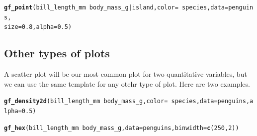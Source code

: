 \documentclass[twoside]{book}\usepackage[]{graphicx}\usepackage[]{xcolor}
\makeatletter
\newcommand{\hlnum}[1]{\textcolor[rgb]{0.686,0.059,0.569}{#1}}%
\newcommand{\hlopt}[1]{\textcolor[rgb]{0,0,0}{#1}}%
\newcommand{\hlstd}[1]{\textcolor[rgb]{0.345,0.345,0.345}{#1}}%
\newcommand{\hlkwc}[1]{\textcolor[rgb]{0.333,0.667,0.333}{#1}}%
\newcommand{\hlkwd}[1]{\textcolor[rgb]{0.737,0.353,0.396}{\textbf{#1}}}%
\newenvironment{kframe}{%
 \def\at@end@of@kframe{}%
 \ifinner\ifhmode%
  \def\at@end@of@kframe{\end{minipage}}%
  \begin{minipage}{\columnwidth}%
 \fi\fi%
 \def\FrameCommand##1{\hskip\@totalleftmargin \hskip-\fboxsep
 \colorbox{shadecolor}{##1}\hskip-\fboxsep
     \hskip-\linewidth \hskip-\@totalleftmargin \hskip\columnwidth}%
 \MakeFramed {\advance\hsize-\width
   \@totalleftmargin\z@ \linewidth\hsize
   \@setminipage}}%
 {\par\unskip\endMakeFramed%
 \at@end@of@kframe}
\newenvironment{knitrout}{}{} %
\newcounter{example}[section]
\makeatother
\begin{document}
\begin{knitrout}
\color{fgcolor}\begin{kframe}
\begin{alltt}
\hlkwd{gf_point}\hlstd{(bill_length_mm} \hlopt{~} \hlstd{body_mass_g} \hlopt{|} \hlstd{island,} \hlkwc{color} \hlstd{=} \hlopt{~} \hlstd{species,} \hlkwc{data} \hlstd{= penguins,}
         \hlkwc{size} \hlstd{=} \hlnum{0.8}\hlstd{,} \hlkwc{alpha} \hlstd{=} \hlnum{0.5}\hlstd{)}
\end{alltt}


{\ttfamily\noindent\bfseries\color{errorcolor}{\#\# Error in gf\_ingredients(formula = gformula, data = data, gg\_object = object, : object 'penguins' not found}}\end{kframe}
\end{knitrout}

\subsection{Other types of plots}

A scatter plot will be our most common plot for two quantitative variables, but we can use the same
template for any otehr type of plot.  Here are two examples.

\begin{knitrout}
\color{fgcolor}\begin{kframe}
\begin{alltt}
\hlkwd{gf_density2d}\hlstd{(bill_length_mm} \hlopt{~} \hlstd{body_mass_g,} \hlkwc{color} \hlstd{=} \hlopt{~} \hlstd{species,} \hlkwc{data} \hlstd{= penguins,} \hlkwc{alpha} \hlstd{=} \hlnum{0.5}\hlstd{)}
\end{alltt}


{\ttfamily\noindent\bfseries\color{errorcolor}{\#\# Error in gf\_ingredients(formula = gformula, data = data, gg\_object = object, : object 'penguins' not found}}\begin{alltt}
\hlkwd{gf_hex}\hlstd{(bill_length_mm} \hlopt{~} \hlstd{body_mass_g,} \hlkwc{data} \hlstd{= penguins,} \hlkwc{binwidth} \hlstd{=} \hlkwd{c}\hlstd{(}\hlnum{250}\hlstd{,} \hlnum{2}\hlstd{))}
\end{alltt}


{\ttfamily\noindent\bfseries\color{errorcolor}{\#\# Error in gf\_ingredients(formula = gformula, data = data, gg\_object = object, : object 'penguins' not found}}\end{kframe}
\end{knitrout}
\end{document}
